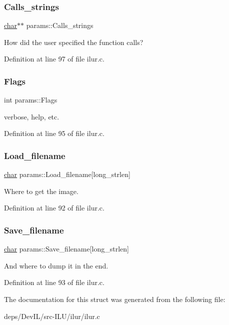 \subsubsection{\texorpdfstring{Calls\+\_\+strings}{Calls\_strings}}
{\footnotesize\ttfamily \hyperlink{classchar}{char}$\ast$$\ast$ params\+::\+Calls\+\_\+strings}



How did the user specified the function calls? 



Definition at line 97 of file ilur.\+c.

\mbox{\label{structparams_aa2d6c2e17c6e9fe4377451a7378f276d}} 
\subsubsection{\texorpdfstring{Flags}{Flags}}
{\footnotesize\ttfamily int params\+::\+Flags}



verbose, help, etc. 



Definition at line 95 of file ilur.\+c.

\mbox{\label{structparams_a3c4247cbeaf86aa088dadb789a51b9ae}} 
\subsubsection{\texorpdfstring{Load\+\_\+filename}{Load\_filename}}
{\footnotesize\ttfamily \hyperlink{classchar}{char} params\+::\+Load\+\_\+filename\mbox{[}long\+\_\+strlen\mbox{]}}



Where to get the image. 



Definition at line 92 of file ilur.\+c.

\mbox{\label{structparams_a91d52a48992ad7266ea9529c6958b63c}} 
\subsubsection{\texorpdfstring{Save\+\_\+filename}{Save\_filename}}
{\footnotesize\ttfamily \hyperlink{classchar}{char} params\+::\+Save\+\_\+filename\mbox{[}long\+\_\+strlen\mbox{]}}



And where to dump it in the end. 



Definition at line 93 of file ilur.\+c.



The documentation for this struct was generated from the following file\+:\begin{DoxyCompactItemize}
\item 
deps/\+Dev\+I\+L/src-\/\+I\+L\+U/ilur/ilur.\+c\end{DoxyCompactItemize}
